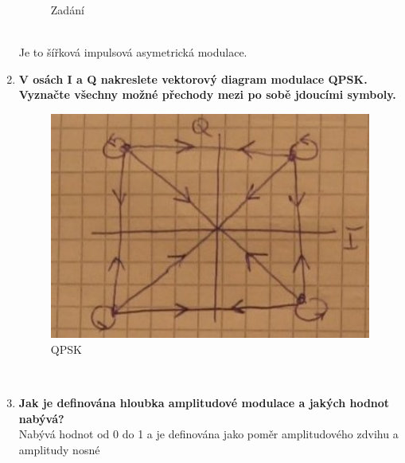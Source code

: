 \begin{enumerate}
\begin{figure}[h]
        \caption{Zadání}
    \end{figure}\\
    Je to šířková impulsová asymetrická modulace.
    \item \textbf{V osách I a Q nakreslete vektorový diagram modulace QPSK. Vyznačte všechny možné
    přechody mezi po sobě jdoucími symboly.}
    \begin{figure}[h]
        \centering
        \includegraphics[scale = 0.5]{images/QPSKMal.png}
        \caption{QPSK}
    \end{figure}\\
    \item \textbf{Jak je definována hloubka amplitudové modulace a jakých hodnot nabývá?}\\
    Nabývá hodnot od 0 do 1 a je definována jako poměr amplitudového zdvihu a amplitudy nosné
\end{enumerate}

